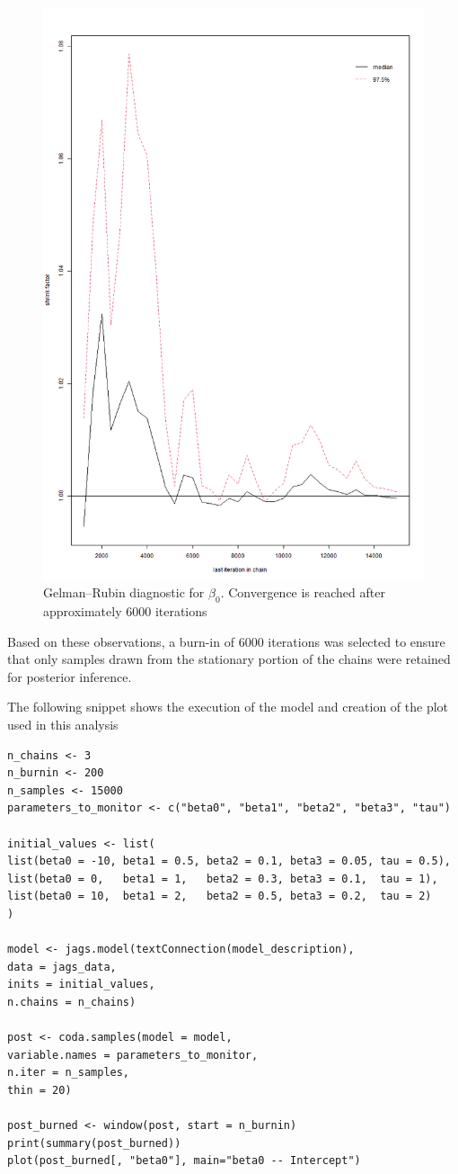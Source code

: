 \documentclass[]{article}
\begin{document}
\begin{figure}[H]
	\centering
	\includegraphics[width=0.7\linewidth]{img/img-gelman-plot-beta0}
	\caption{Gelman--Rubin diagnostic for $\beta_0$. Convergence is reached after approximately 6000 iterations}
	\label{fig:img-gelman-plot-beta0}
\end{figure}


Based on these observations, a burn-in of 6000 iterations was selected to ensure that only samples drawn from the stationary portion of the chains were retained for posterior inference.


The following snippet shows the execution of the model and creation of the plot used in this analysis

\begin{lstlisting}
n_chains <- 3
n_burnin <- 200
n_samples <- 15000
parameters_to_monitor <- c("beta0", "beta1", "beta2", "beta3", "tau")

initial_values <- list(
list(beta0 = -10, beta1 = 0.5, beta2 = 0.1, beta3 = 0.05, tau = 0.5),
list(beta0 = 0,   beta1 = 1,   beta2 = 0.3, beta3 = 0.1,  tau = 1),
list(beta0 = 10,  beta1 = 2,   beta2 = 0.5, beta3 = 0.2,  tau = 2)
)

model <- jags.model(textConnection(model_description),
data = jags_data,
inits = initial_values,
n.chains = n_chains)

post <- coda.samples(model = model,
variable.names = parameters_to_monitor,
n.iter = n_samples,
thin = 20)

post_burned <- window(post, start = n_burnin)
print(summary(post_burned))
plot(post_burned[, "beta0"], main="beta0 -- Intercept")
\end{lstlisting}
\end{document}
